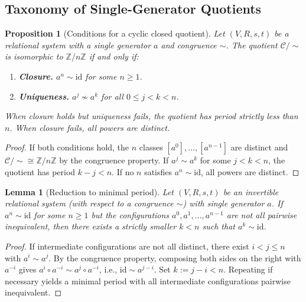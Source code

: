 \documentclass{article}
\newtheorem{lemma}[theorem]{Lemma}
\newtheorem{proposition}[theorem]{Proposition}
\theoremstyle{definition}
\theoremstyle{remark}
\newcommand{\RC}{\mathcal{C}}
\newcommand{\id}{\mathrm{id}}
\begin{document}
\subsection{Taxonomy of Single-Generator Quotients}
\label{sec:taxonomy}

\begin{proposition}[Conditions for a cyclic closed quotient]
\label{prop:closed}
Let $(V, R, s, t)$ be a relational system with a single
generator $a$ and congruence $\sim$. The quotient $\RC/{\sim}$ is
isomorphic to $\mathbb{Z}/n\mathbb{Z}$ if and only if:
\begin{enumerate}[label=(\roman*)]
  \item \textbf{Closure.} $a^n \sim \id$ for some $n \geq 1$.
  \item \textbf{Uniqueness.} $a^j \not\sim a^k$ for all
        $0 \leq j < k < n$.
\end{enumerate}
When closure holds but uniqueness fails, the quotient has period
strictly less than $n$. When closure fails, all powers are
distinct.
\end{proposition}

\begin{proof}
If both conditions hold, the $n$ classes $[a^0], \dots, [a^{n-1}]$
are distinct and $\RC/{\sim} \cong \mathbb{Z}/n\mathbb{Z}$ by the
congruence property. If $a^j \sim a^k$ for some $j < k < n$, the
quotient has period $k - j < n$. If no $n$ satisfies $a^n \sim \id$,
all powers are distinct.
\end{proof}

\begin{lemma}[Reduction to minimal period]
\label{lem:reduction}
Let $(V, R, s, t)$ be an \emph{invertible} relational system
(with respect to a congruence $\sim$) with single generator $a$.
If $a^n \sim \id$ for some $n \geq 1$ but the configurations
$a^0, a^1, \dots, a^{n-1}$ are not all pairwise inequivalent,
then there exists a strictly smaller $k < n$ such that
$a^k \sim \id$.
\end{lemma}

\begin{proof}
If intermediate configurations are not all distinct, there exist
$i < j \leq n$ with $a^i \sim a^j$. By the congruence property,
composing both sides on the right with $a^{-i}$ gives
$a^i \circ a^{-i} \sim a^j \circ a^{-i}$, i.e.,
$\id \sim a^{j-i}$. Set $k := j - i < n$. Repeating if necessary
yields a minimal period with all intermediate configurations
pairwise inequivalent.
\end{proof}
\end{document}
